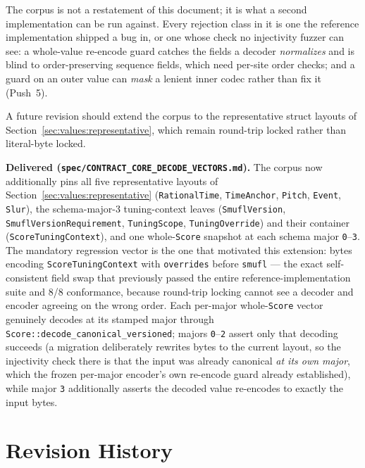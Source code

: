 \documentclass[11pt,letterpaper]{report}
\newcommand{\ub}{\_\allowbreak}
\begin{document}
\begin{rationale}
  The corpus is not a restatement of this document; it is what a second
  implementation can be run against. Every rejection class in it is one the
  reference implementation shipped a bug in, or one whose check no injectivity
  fuzzer can see: a whole-value re-encode guard catches the fields a decoder
  \emph{normalizes} and is blind to order-preserving sequence fields, which need
  per-site order checks; and a guard on an outer value can \emph{mask} a lenient
  inner codec rather than fix it (Push~5).

  A future revision should extend the corpus to the representative struct
  layouts of Section~\ref{sec:values:representative}, which remain round-trip
  locked rather than literal-byte locked.

  \textbf{Delivered (\texttt{spec/CONTRACT\_CORE\_DECODE\_VECTORS.md}).} The
  corpus now additionally pins all five representative layouts of
  Section~\ref{sec:values:representative} (\texttt{RationalTime},
  \texttt{TimeAnchor}, \texttt{Pitch}, \texttt{Event}, \texttt{Slur}), the
  schema-major-3 tuning-context leaves (\texttt{SmuflVersion},
  \texttt{SmuflVersionRequirement}, \texttt{TuningScope},
  \texttt{TuningOverride}) and their container (\texttt{ScoreTuningContext}),
  and one whole-\texttt{Score} snapshot at each schema major
  \texttt{0}--\texttt{3}. The mandatory regression vector is the one that
  motivated this extension: bytes encoding \texttt{ScoreTuningContext} with
  \texttt{overrides} before \texttt{smufl} --- the exact self-consistent field
  swap that previously passed the entire reference-implementation suite and
  8/8 conformance, because round-trip locking cannot see a decoder and
  encoder agreeing on the wrong order. Each per-major whole-\texttt{Score}
  vector genuinely decodes at its stamped major through
  \texttt{Score::decode\ub canonical\ub versioned}; majors \texttt{0}--\texttt{2}
  assert only that decoding succeeds (a migration deliberately rewrites bytes
  to the current layout, so the injectivity check there is that the input was
  already canonical \emph{at its own major}, which the frozen per-major
  encoder's own re-encode guard already established), while major \texttt{3}
  additionally asserts the decoded value re-encodes to exactly the input
  bytes.
\end{rationale}

\chapter{Revision History}
\label{ch:history}
\end{document}
